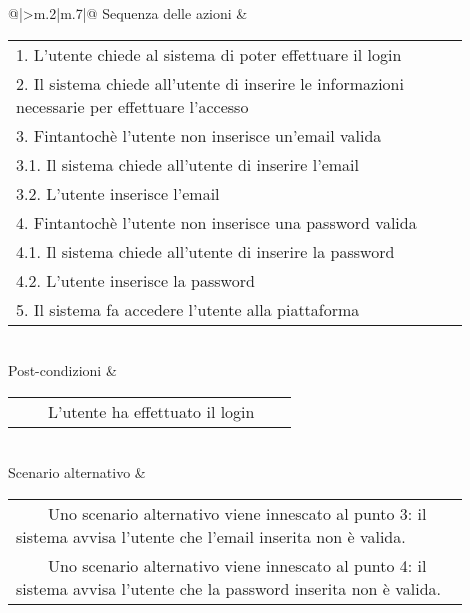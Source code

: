 \begin{table}[H]
\begin{longtable}{@{}|>{\centering\arraybackslash}m{.2\textwidth}|m{.7\textwidth}|@{}}
		Sequenza delle azioni & \begin{tabular}{m{0.9\linewidth}}\hspace{0.0cm}1. L'utente chiede al sistema di poter effettuare il login\\\hspace{0.0cm}2. Il sistema chiede all'utente di inserire le informazioni necessarie per effettuare l'accesso\\\hspace{0.0cm}3. Fintantochè l'utente non inserisce un'email valida\\\hspace{0.5cm}\hspace{0.0cm}3.1. Il sistema chiede all'utente di inserire l'email\\\hspace{0.5cm}\hspace{0.0cm}3.2. L'utente inserisce l'email\\\hspace{0.0cm}4. Fintantochè l'utente non inserisce una password valida\\\hspace{0.5cm}\hspace{0.0cm}4.1. Il sistema chiede all'utente di inserire la password\\\hspace{0.5cm}\hspace{0.0cm}4.2. L'utente inserisce la password\\\hspace{0.0cm}5. Il sistema fa accedere l'utente alla piattaforma\\\end{tabular}\\
		Post-condizioni & \begin{tabular}{m{0.9\linewidth}}~~\llap{\textbullet}~~L'utente ha effettuato il login\\\end{tabular}\\
		Scenario alternativo & \begin{tabular}{m{0.9\linewidth}}~~\llap{\textbullet}~~Uno scenario alternativo viene innescato al punto 3: il sistema avvisa l'utente che l'email inserita non è valida.\\~~\llap{\textbullet}~~Uno scenario alternativo viene innescato al punto 4: il sistema avvisa l'utente che la password inserita non è valida.\\\end{tabular}\\\hline
		
	\end{longtable}
\end{table}

